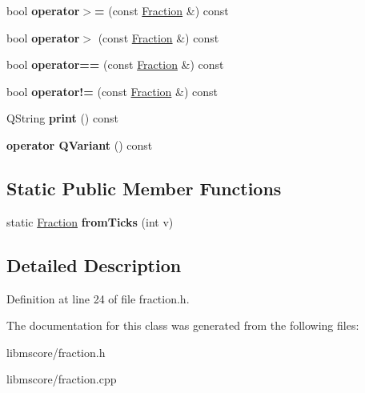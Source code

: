 \begin{DoxyCompactItemize}
\mbox{\label{class_ms_1_1_fraction_a469852ffe9508e5a6c0db71afc58acb7}} 
bool {\bfseries operator$>$=} (const \hyperlink{class_ms_1_1_fraction}{Fraction} \&) const
\item 
\mbox{\label{class_ms_1_1_fraction_ab8e368760777b646b566b4f3a0822920}} 
bool {\bfseries operator$>$} (const \hyperlink{class_ms_1_1_fraction}{Fraction} \&) const
\item 
\mbox{\label{class_ms_1_1_fraction_af6aa7a9c48efbd21008d0c88a9771820}} 
bool {\bfseries operator==} (const \hyperlink{class_ms_1_1_fraction}{Fraction} \&) const
\item 
\mbox{\label{class_ms_1_1_fraction_a03488baf0c06d758a701c98f6094f4e5}} 
bool {\bfseries operator!=} (const \hyperlink{class_ms_1_1_fraction}{Fraction} \&) const
\item 
\mbox{\label{class_ms_1_1_fraction_ae6e87a05be6f24d5c4f69b943d49dd88}} 
Q\+String {\bfseries print} () const
\item 
\mbox{\label{class_ms_1_1_fraction_aec63213b9bfb57be20c5659b03c704f4}} 
{\bfseries operator Q\+Variant} () const
\end{DoxyCompactItemize}
\subsection*{Static Public Member Functions}
\begin{DoxyCompactItemize}
\item 
\mbox{\label{class_ms_1_1_fraction_a1c4412959c02dc31fd563efcec174781}} 
static \hyperlink{class_ms_1_1_fraction}{Fraction} {\bfseries from\+Ticks} (int v)
\end{DoxyCompactItemize}


\subsection{Detailed Description}


Definition at line 24 of file fraction.\+h.



The documentation for this class was generated from the following files\+:\begin{DoxyCompactItemize}
\item 
libmscore/fraction.\+h\item 
libmscore/fraction.\+cpp\end{DoxyCompactItemize}
